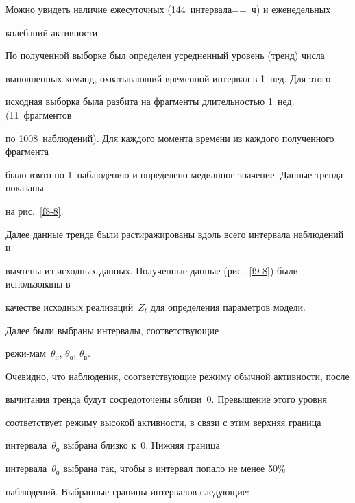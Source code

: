       Можно увидеть наличие ежесуточных (144~интервала\;=\linebreak \;=~ч) и еженедельных 


колебаний активности.


      


      По полученной выборке был определен усредненный уровень (тренд) числа 


выполненных команд, охватывающий временной интервал в 1~нед. Для этого 


исходная выборка была разбита на фрагменты длительностью 1~нед. (11~фрагментов 


по 1008~наблюдений). Для каждого момента времени из каждого полученного фрагмента 


было взято по 1~наблюдению и определено медианное значение. Данные тренда показаны 


на рис.~\ref{f8-8}.


      





      Далее данные тренда были растиражированы вдоль всего интервала наблюдений и 


вычтены из исходных данных. Полученные данные (рис.~\ref{f9-8}) были использованы в 


качестве исходных реализаций~$Z_t$ для определения параметров модели.











      Далее были выбраны интервалы, соответствующие 


режи-\linebreak мам~$\theta_{\mathrm{н}}$, $\theta_{\mathrm{о}}$, $\theta_{\mathrm{в}}$. 


Очевидно, что наблюдения, соответствующие режиму обычной активности, после 


вычитания тренда будут сосредоточены вблизи~0. Превышение этого уровня 


соответствует режиму высокой активности, в связи с этим верхняя граница 


интервала~$\theta_{\mathrm{о}}$ выбрана близко к~0. Нижняя граница 


интервала~$\theta_{\mathrm{о}}$ выбрана так, чтобы в интервал попало не менее 50\% 


наблюдений. Выбранные границы интервалов следующие:        


